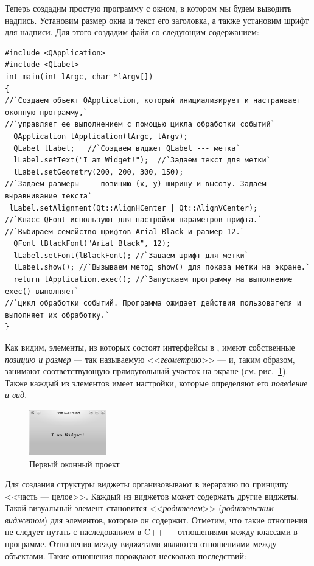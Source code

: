 Теперь создадим простую программу с окном, в котором мы будем выводить надпись. Установим размер окна и текст его
заголовка, а также установим шрифт для надписи. Для этого создадим файл
 со следующим содержанием:
\begin{lstlisting}
#include <QApplication>
#include <QLabel>
int main(int lArgc, char *lArgv[])
{
//`Создаем объект QApplication, который инициализирует и настраивает оконную программу,` 
//`управляет ее выполнением с помощью цикла обработки событий`
  QApplication lApplication(lArgc, lArgv);
  QLabel lLabel;   //`Создаем виджет QLabel --- метка`
  lLabel.setText("I am Widget!");  //`Задаем текст для метки`
  lLabel.setGeometry(200, 200, 300, 150);
//`Задаем размеры --- позицию (x, y) ширину и высоту. Задаем выравнивание текста`
 lLabel.setAlignment(Qt::AlignHCenter | Qt::AlignVCenter);
//`Класс QFont используют для настройки параметров шрифта.` 
//`Выбираем семейство шрифтов Arial Black и размер 12.`
  QFont lBlackFont("Arial Black", 12);
  lLabel.setFont(lBlackFont); //`Задаем шрифт для метки`
  lLabel.show(); //`Вызываем метод show() для показа метки на экране.`
  return lApplication.exec(); //`Запускаем программу на выполнение exec() выполняет` 
//`цикл обработки событий. Программа ожидает действия пользователя и выполняет их обработку.`
}
\end{lstlisting}

Как видим, элементы, из которых состоят интерфейсы в , имеют собственные \emph{позицию и размер} --- так называемую <<\emph{геометрию}>> --- и, таким образом, занимают
соответствующую прямоугольный участок на экране (см. рис.~\ref{ch13:refDrawing0}). Также каждый из элементов имеет
настройки, которые определяют его \emph{поведение и вид}.

\begin{figure}[htb]
\begin{center}
\includegraphics[width=0.3\textwidth]{img/ris_13_1}
\caption[Первый оконный проект]{Первый оконный проект}
\label{ch13:refDrawing0}
\end{center}
\end{figure}

Для создания структуры  виджеты организовывают в иерархию по принципу <<часть --- целое>>. Каждый из виджетов может
содержать другие виджеты. Такой  визуальный элемент становится <<\emph{родителем}>> (\emph{родительским виджетом}) для элементов, которые он содержит. Отметим, что такие отношения не следует
путать с наследованием в C++ --- отношениями между классами в программе. Отношения между виджетами являются отношениями
между объектами. Такие отношения порождают несколько последствий:

